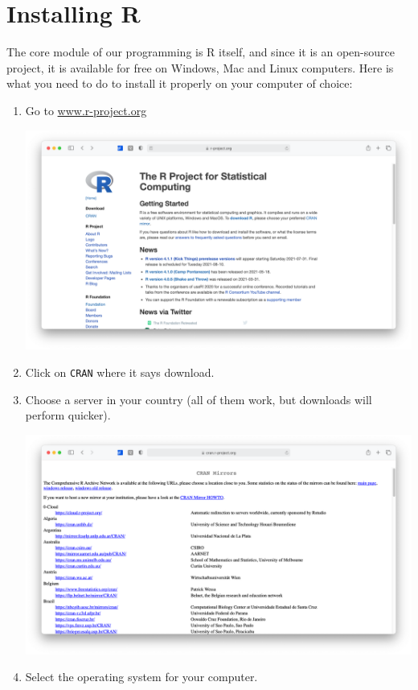 \documentclass[
]{book}
\begin{document}
\hypertarget{installing-r}{%
\section{Installing R}\label{installing-r}}

The core module of our programming is R itself, and since it is an open-source project, it is available for free on Windows, Mac and Linux computers. Here is what you need to do to install it properly on your computer of choice:

\begin{enumerate}
\def\labelenumi{\arabic{enumi}.}
\item
  Go to \href{https://www.r-project.org\%5D(https://www.r-project.org)}{www.r-project.org}

  \includegraphics{images/chapter_03_img/r_project/00_r_project_page.png}
\item
  Click on \texttt{CRAN} where it says download.
\item
  Choose a server in your country (all of them work, but downloads will perform quicker).

  \includegraphics{images/chapter_03_img/r_project/01_r_project_cran_mirror.png}
\item
  Select the operating system for your computer.


\end{enumerate}
\end{document}
